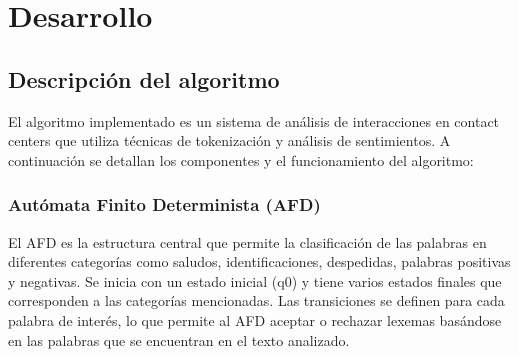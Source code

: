 \documentclass[12pt,a4paper]{article}
\begin{document}
\newpage
\section{Desarrollo}

\subsection{Descripción del algoritmo}
El algoritmo implementado es un sistema de análisis de interacciones en contact centers que utiliza técnicas de tokenización y análisis de sentimientos. A continuación se detallan los componentes y el funcionamiento del algoritmo:

\subsubsection{Autómata Finito Determinista (AFD)}
El AFD es la estructura central que permite la clasificación de las palabras en diferentes categorías como saludos, identificaciones, despedidas, palabras positivas y negativas. Se inicia con un estado inicial (q0) y tiene varios estados finales que corresponden a las categorías mencionadas.
Las transiciones se definen para cada palabra de interés, lo que permite al AFD aceptar o rechazar lexemas basándose en las palabras que se encuentran en el texto analizado.
\end{document}
